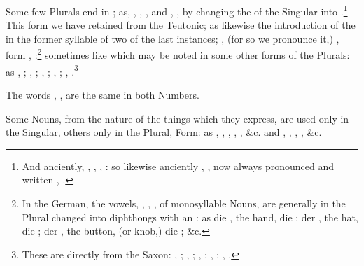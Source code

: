 Some few Plurals end in ; as, , ,
, and , , by changing the  of the
Singular into .\footnote{And anciently, , ,
  , : so likewise anciently , ,
  now always pronounced and written , .} This form we
have retained from the Teutonic; as likewise the introduction of the
 in the former syllable of two of the last instances; ,
(for so we pronounce it,) , form ,
:\footnote{In the German, the vowels, , ,
  , of monosyllable Nouns, are generally in the Plural changed
  into diphthongs with an : as die , the hand, die
  ; der , the hat, die ; der
  , the button, (or knob,) die ; \&c.}
sometimes like which may be noted in some other forms of the Plurals: as
, ; , ; , ;
, ; , .\footnote{These are
  directly from the Saxon: , ; , ;
  , ; , ; , .}

The words , , are the same in both Numbers.

Some Nouns, from the nature of the things which they express, are used
only in the Singular, others only in the Plural, Form: as ,
, , , , \&c. and ,
, , , \&c.

